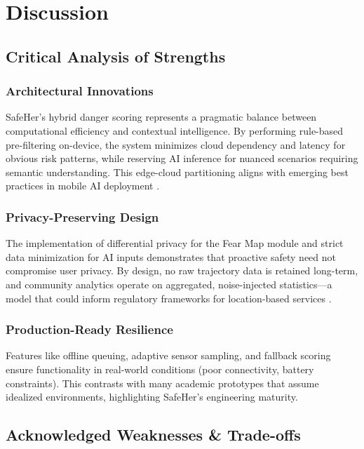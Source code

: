 \section{Discussion}

\subsection{Critical Analysis of Strengths}

\subsubsection{Architectural Innovations}
SafeHer's hybrid danger scoring represents a pragmatic balance between computational efficiency and contextual intelligence. By performing rule-based pre-filtering on-device, the system minimizes cloud dependency and latency for obvious risk patterns, while reserving AI inference for nuanced scenarios requiring semantic understanding. This edge-cloud partitioning aligns with emerging best practices in mobile AI deployment \cite{rao2024}.

\subsubsection{Privacy-Preserving Design}
The implementation of differential privacy for the Fear Map module and strict data minimization for AI inputs demonstrates that proactive safety need not compromise user privacy. By design, no raw trajectory data is retained long-term, and community analytics operate on aggregated, noise-injected statistics---a model that could inform regulatory frameworks for location-based services \cite{edpb2023}.

\subsubsection{Production-Ready Resilience}
Features like offline queuing, adaptive sensor sampling, and fallback scoring ensure functionality in real-world conditions (poor connectivity, battery constraints). This contrasts with many academic prototypes that assume idealized environments, highlighting SafeHer's engineering maturity.

\subsection{Acknowledged Weaknesses \& Trade-offs}

